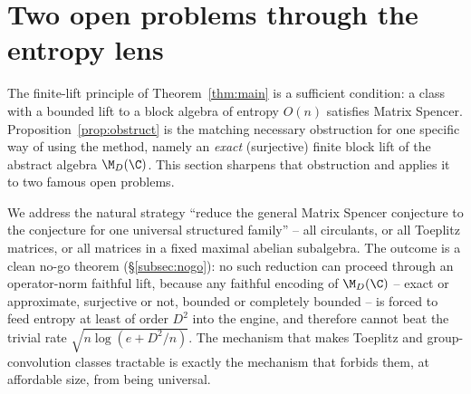 %
%
%

\providecommand{\HS}{\mathrm{HS}}
\providecommand{\Herm}{\mathrm{Herm}}
\providecommand{\Diag}{\mathrm{Diag}}
\providecommand{\cover}{\mathsf N}
\providecommand{\lent}{\mathsf L}

\section{Two open problems through the entropy lens}
\label{sec:universal}

The finite-lift principle of Theorem~\ref{thm:main} is a sufficient condition: a
class with a bounded lift to a block algebra of entropy $O(n)$ satisfies Matrix
Spencer. Proposition~\ref{prop:obstruct} is the matching necessary obstruction
for one specific way of using the method, namely an \emph{exact} (surjective)
finite block lift of the abstract algebra $\M_D(\C)$. This section sharpens that
obstruction and applies it to two famous open problems.

We address the natural strategy ``reduce the general Matrix Spencer conjecture to
the conjecture for one universal structured family'' -- all circulants, or all
Toeplitz matrices, or all matrices in a fixed maximal abelian subalgebra. The
outcome is a clean no-go theorem (\S\ref{subsec:nogo}): no such reduction can
proceed through an operator-norm faithful lift, because any faithful encoding of
$\M_D(\C)$ -- exact or approximate, surjective or not, bounded or completely
bounded -- is forced to feed entropy at least of order $D^2$ into the engine, and
therefore cannot beat the trivial rate $\sqrt{n\log(e+D^2/n)}$. The mechanism that
makes Toeplitz and group-convolution classes tractable is exactly the mechanism
that forbids them, at affordable size, from being universal.

